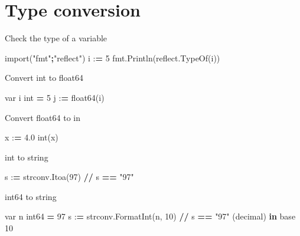 \documentclass[]{book}
\newenvironment{Shaded}{\begin{snugshade}}{\end{snugshade}}
\newcommand{\KeywordTok}[1]{\textcolor[rgb]{0.13,0.29,0.53}{\textbf{#1}}}
\newcommand{\DecValTok}[1]{\textcolor[rgb]{0.00,0.00,0.81}{#1}}
\newcommand{\FloatTok}[1]{\textcolor[rgb]{0.00,0.00,0.81}{#1}}
\newcommand{\StringTok}[1]{\textcolor[rgb]{0.31,0.60,0.02}{#1}}
\newcommand{\ImportTok}[1]{#1}
\newcommand{\OperatorTok}[1]{\textcolor[rgb]{0.81,0.36,0.00}{\textbf{#1}}}
\newcommand{\BuiltInTok}[1]{#1}
\newcommand{\NormalTok}[1]{#1}
\begin{document}
\section{Type conversion}\label{type-conversion}

Check the type of a variable

\begin{Shaded}
\begin{Highlighting}[]
\ImportTok{import}\NormalTok{(}\StringTok{"fmt"}\OperatorTok{;}\StringTok{"reflect"}\NormalTok{)}
\NormalTok{i :}\OperatorTok{=} \DecValTok{5}
\NormalTok{fmt.Println(reflect.TypeOf(i))}
\end{Highlighting}
\end{Shaded}

Convert int to float64

\begin{Shaded}
\begin{Highlighting}[]
\NormalTok{var i }\BuiltInTok{int} \OperatorTok{=} \DecValTok{5}
\NormalTok{j :}\OperatorTok{=}\NormalTok{ float64(i)}
\end{Highlighting}
\end{Shaded}

Convert float64 to in

\begin{Shaded}
\begin{Highlighting}[]
\NormalTok{x :}\OperatorTok{=} \FloatTok{4.0}
\BuiltInTok{int}\NormalTok{(x)}
\end{Highlighting}
\end{Shaded}

int to string

\begin{Shaded}
\begin{Highlighting}[]
\NormalTok{s :}\OperatorTok{=}\NormalTok{ strconv.Itoa(}\DecValTok{97}\NormalTok{) }\OperatorTok{//}\NormalTok{ s }\OperatorTok{==} \StringTok{"97"}
\end{Highlighting}
\end{Shaded}

int64 to string

\begin{Shaded}
\begin{Highlighting}[]
\NormalTok{var n int64 }\OperatorTok{=} \DecValTok{97}
\NormalTok{s :}\OperatorTok{=}\NormalTok{ strconv.FormatInt(n, }\DecValTok{10}\NormalTok{) }\OperatorTok{//}\NormalTok{ s }\OperatorTok{==} \StringTok{"97"}\NormalTok{ (decimal) }\KeywordTok{in}\NormalTok{ base }\DecValTok{10}
\end{Highlighting}
\end{Shaded}
\end{document}
